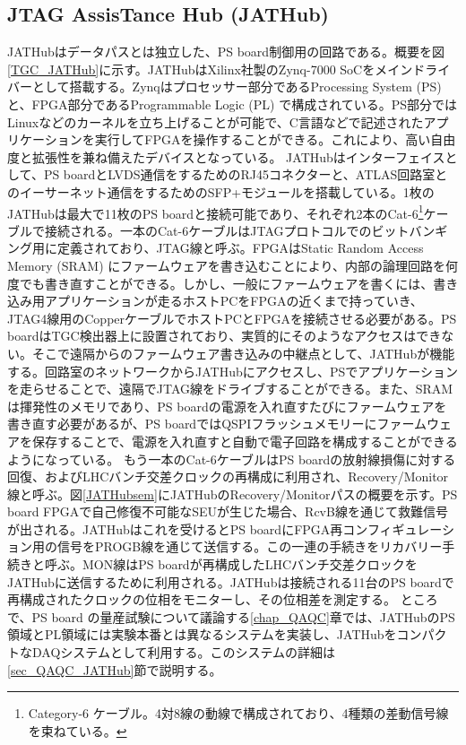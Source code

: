         \subsection*{JTAG AssisTance Hub (JATHub)}
    JATHubはデータパスとは独立した、PS board制御用の回路である。概要を図\ref{TGC_JATHub}に示す。JATHubはXilinx社製のZynq-7000 SoCをメインドライバーとして搭載する。Zynqはプロセッサー部分であるProcessing System  (PS) と、FPGA部分であるProgrammable Logic  (PL) で構成されている。PS部分ではLinuxなどのカーネルを立ち上げることが可能で、C言語などで記述されたアプリケーションを実行してFPGAを操作することができる。これにより、高い自由度と拡張性を兼ね備えたデバイスとなっている。
    JATHubはインターフェイスとして、PS boardとLVDS通信をするためのRJ45コネクターと、ATLAS回路室とのイーサーネット通信をするためのSFP+モジュールを搭載している。1枚のJATHubは最大で11枚のPS boardと接続可能であり、それぞれ2本のCat-6\footnote{Category-6 ケーブル。4対8線の動線で構成されており、4種類の差動信号線を束ねている。}ケーブルで接続される。一本のCat-6ケーブルはJTAGプロトコルでのビットバンギング用に定義されており、JTAG線と呼ぶ。FPGAはStatic Random Access Memory  (SRAM) にファームウェアを書き込むことにより、内部の論理回路を何度でも書き直すことができる。しかし、一般にファームウェアを書くには、書き込み用アプリケーションが走るホストPCをFPGAの近くまで持っていき、JTAG4線用のCopperケーブルでホストPCとFPGAを接続させる必要がある。PS boardはTGC検出器上に設置されており、実質的にそのようなアクセスはできない。そこで遠隔からのファームウェア書き込みの中継点として、JATHubが機能する。回路室のネットワークからJATHubにアクセスし、PSでアプリケーションを走らせることで、遠隔でJTAG線をドライブすることができる。また、SRAMは揮発性のメモリであり、PS boardの電源を入れ直すたびにファームウェアを書き直す必要があるが、PS boardではQSPIフラッシュメモリーにファームウェアを保存することで、電源を入れ直すと自動で電子回路を構成することができるようになっている。
    もう一本のCat-6ケーブルはPS boardの放射線損傷に対する回復、およびLHCバンチ交差クロックの再構成に利用され、Recovery/Monitor線と呼ぶ。図\ref{JATHubsem}にJATHubのRecovery/Monitorパスの概要を示す。PS board FPGAで自己修復不可能なSEUが生じた場合、RcvB線を通じて救難信号が出される。JATHubはこれを受けるとPS boardにFPGA再コンフィギュレーション用の信号をPROGB線を通じて送信する。この一連の手続きをリカバリー手続きと呼ぶ。MON線はPS boardが再構成したLHCバンチ交差クロックをJATHubに送信するために利用される。JATHubは接続される11台のPS boardで再構成されたクロックの位相をモニターし、その位相差を測定する。
    ところで、PS board の量産試験について議論する\ref{chap_QAQC}章では、JATHubのPS領域とPL領域には実験本番とは異なるシステムを実装し、JATHubをコンパクトなDAQシステムとして利用する。このシステムの詳細は\ref{sec_QAQC_JATHub}節で説明する。



